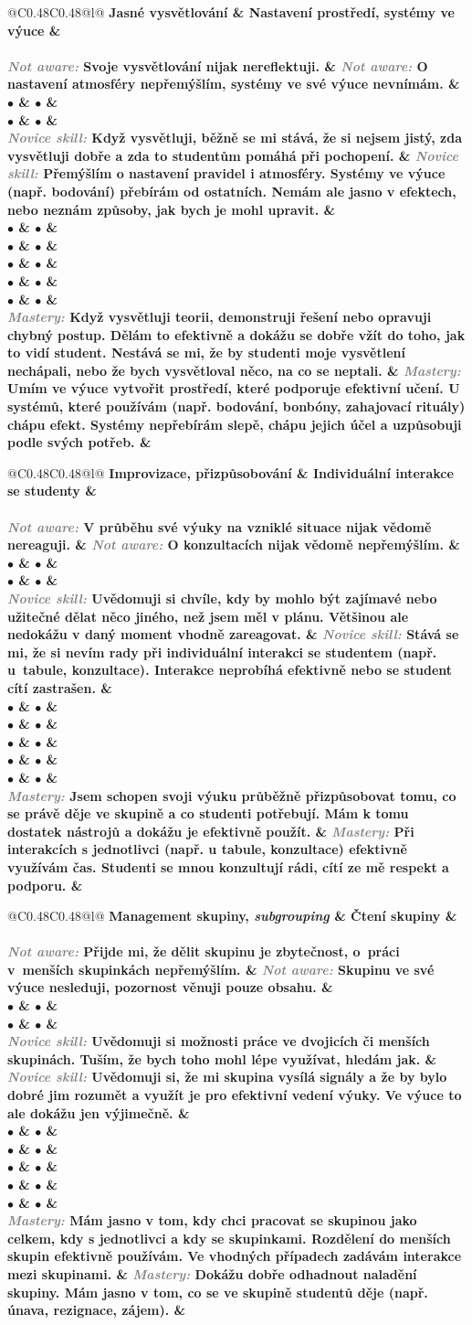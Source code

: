 \documentclass[twoside,openany]{book}
\makeatletter
\newcommand{\note}[1]{\textcolor{gray}{\small\itshape #1}}
\newcommand{\rubricpage}[8]{
\newpage
\begin{tabular}{@{}C{0.48\textwidth}C{0.48\textwidth}@{}l@{}}
\normalsize \bfseries #1 & \normalsize \bfseries #5 & \\[1em] \hline \\[-1.2em]
	\justify \note{Not aware:} #2 & \justify \note{Not aware:} #6 & \\[2em]
$\bullet$ & $\bullet$ & \\
$\bullet$ & $\bullet$ & \\
\justify \note{Novice skill:} #3 & \justify \note{Novice skill:} #7 & \\[3em]
$\bullet$ & $\bullet$ & \\
$\bullet$ & $\bullet$ & \\
$\bullet$ & $\bullet$ & \\
$\bullet$ & $\bullet$ & \\
$\bullet$ & $\bullet$ & \\
\justify \note{Mastery:} #4 & \justify \note{Mastery:} #8 &
\end{tabular}
}
\makeatother
\begin{document}
\rubricpage{Jasné vysvětlování}
{Svoje vysvětlování nijak nereflektuji.}
{Když vysvětluji, běžně se mi stává, že si nejsem jistý, zda vysvětluji dobře a zda to studentům pomáhá při pochopení.}
{Když vysvětluji teorii, demonstruji řešení nebo opravuji chybný postup. Dělám to efektivně a dokážu se dobře vžít do toho, jak to vidí student. Nestává se mi, že by studenti moje vysvětlení nechápali, nebo že bych vysvětloval něco, na co se neptali.}
{Nastavení prostředí, systémy ve výuce}
{O nastavení atmosféry nepřemýšlím, systémy ve své výuce nevnímám.}
{Přemýšlím o nastavení pravidel i atmosféry. Systémy ve výuce (např. bodování) přebírám od ostatních. Nemám ale jasno v efektech, nebo neznám způsoby, jak bych je mohl upravit.}
{Umím ve výuce vytvořit prostředí, které podporuje efektivní učení. U systémů, které používám (např. bodování, bonbóny, zahajovací rituály) chápu efekt. Systémy nepřebírám slepě, chápu jejich účel a uzpůsobuji podle svých potřeb.}

\rubricpage{Improvizace, přizpůsobování}
{V průběhu své výuky na vzniklé situace nijak vědomě nereaguji.}
{Uvědomuji si chvíle, kdy by mohlo být zajímavé nebo užitečné dělat něco jiného, než jsem měl v plánu. Většinou ale nedokážu v daný moment vhodně zareagovat.}
{Jsem schopen svoji výuku průběžně přizpůsobovat tomu, co se právě děje ve skupině a co studenti potřebují. Mám k tomu dostatek nástrojů a dokážu je efektivně použít.}
{Individuální interakce se studenty}
{O konzultacích nijak vědomě nepřemýšlím.}
{Stává se mi, že si nevím rady při individuální interakci se studentem (např. u~tabule, konzultace). Interakce neprobíhá efektivně nebo se student cítí zastrašen.}
{Při interakcích s jednotlivci (např. u tabule, konzultace) efektivně využívám čas. Studenti se mnou konzultují rádi, cítí ze mě respekt a podporu.}

\rubricpage{Management skupiny, \textit{subgrouping}}
{Přijde mi, že dělit skupinu je zbytečnost, o~práci v~menších skupinkách nepřemýšlím.}
{Uvědomuji si možnosti práce ve dvojicích či menších skupinách. Tuším, že bych toho mohl lépe využívat, hledám jak.}
{Mám jasno v tom, kdy chci pracovat se skupinou jako celkem, kdy s jednotlivci a kdy se skupinkami. Rozdělení do menších skupin efektivně používám. Ve vhodných případech zadávám interakce mezi skupinami.}
{Čtení skupiny}
{Skupinu ve své výuce nesleduji, pozornost věnuji pouze obsahu.}
{Uvědomuji si, že mi skupina vysílá signály a že by bylo dobré jim rozumět a využít je pro efektivní vedení výuky. Ve výuce to ale dokážu jen výjimečně.}
{Dokážu dobře odhadnout naladění skupiny. Mám jasno v tom, co se ve skupině studentů děje (např. únava, rezignace, zájem).}
\end{document}
